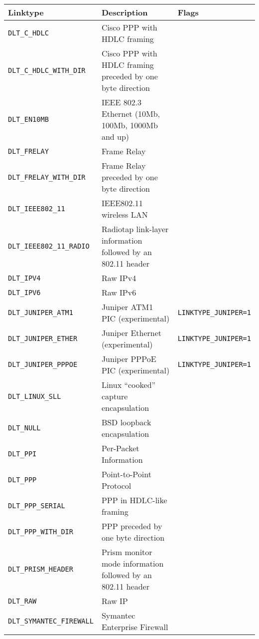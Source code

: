 \begin{longtable}{lll}
    \toprule
    {\bf Linktype} & {\bf Description} & {\bf Flags}\\
    \midrule\endhead%
    {\tt\small DLT\_C\_HDLC} & Cisco PPP with HDLC framing\\
    {\tt\small DLT\_C\_HDLC\_WITH\_DIR} & Cisco PPP with HDLC framing preceded by one byte direction\\
    {\tt\small DLT\_EN10MB} & IEEE 802.3 Ethernet (10Mb, 100Mb, 1000Mb and up)\\
    {\tt\small DLT\_FRELAY} & Frame Relay\\
    {\tt\small DLT\_FRELAY\_WITH\_DIR} & Frame Relay preceded by one byte direction\\
    {\tt\small DLT\_IEEE802\_11} & IEEE802.11 wireless LAN\\
    {\tt\small DLT\_IEEE802\_11\_RADIO} & Radiotap link-layer information followed by an 802.11 header\\
    {\tt\small DLT\_IPV4} & Raw IPv4\\
    {\tt\small DLT\_IPV6} & Raw IPv6\\
    {\tt\small DLT\_JUNIPER\_ATM1} & Juniper ATM1 PIC (experimental) & {\tt LINKTYPE\_JUNIPER=1}\\
    {\tt\small DLT\_JUNIPER\_ETHER} & Juniper Ethernet (experimental) & {\tt LINKTYPE\_JUNIPER=1}\\
    {\tt\small DLT\_JUNIPER\_PPPOE} & Juniper PPPoE PIC (experimental) & {\tt LINKTYPE\_JUNIPER=1}\\
    {\tt\small DLT\_LINUX\_SLL} & Linux ``cooked'' capture encapsulation\\
    {\tt\small DLT\_NULL} & BSD loopback encapsulation\\
    {\tt\small DLT\_PPI} & Per-Packet Information\\
    {\tt\small DLT\_PPP} & Point-to-Point Protocol\\
    {\tt\small DLT\_PPP\_SERIAL} & PPP in HDLC-like framing\\
    {\tt\small DLT\_PPP\_WITH\_DIR} & PPP preceded by one byte direction\\
    {\tt\small DLT\_PRISM\_HEADER} & Prism monitor mode information followed by an 802.11 header\\
    {\tt\small DLT\_RAW} & Raw IP\\
    {\tt\small DLT\_SYMANTEC\_FIREWALL} & Symantec Enterprise Firewall\\
    \bottomrule
\end{longtable}

